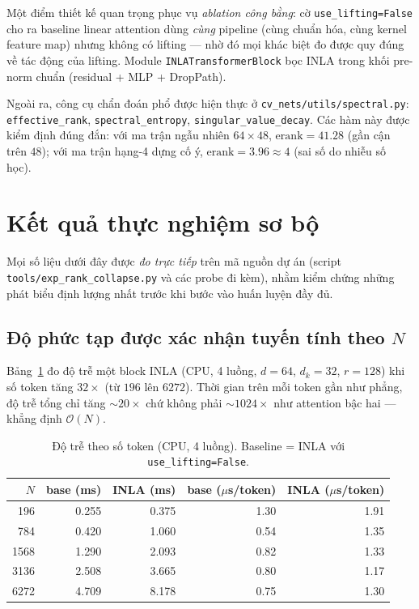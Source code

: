 \documentclass[12pt,a4paper]{article}
\begin{document}
Một điểm thiết kế quan trọng phục vụ \emph{ablation công bằng}: cờ \texttt{use\_lifting=False} cho ra
baseline linear attention dùng \emph{cùng} pipeline (cùng chuẩn hóa, cùng kernel feature map) nhưng
không có lifting --- nhờ đó mọi khác biệt đo được quy đúng về tác động của lifting. Module
\texttt{INLATransformerBlock} bọc INLA trong khối pre-norm chuẩn (residual + MLP + DropPath).

Ngoài ra, công cụ chẩn đoán phổ được hiện thực ở \texttt{cv\_nets/utils/spectral.py}:
\texttt{effective\_rank}, \texttt{spectral\_entropy}, \texttt{singular\_value\_decay}. Các hàm này
được kiểm định đúng đắn: với ma trận ngẫu nhiên $64\times 48$, $\mathrm{erank}=41.28$ (gần cận trên
$48$); với ma trận hạng-4 dựng cố ý, $\mathrm{erank}=3.96 \approx 4$ (sai số do nhiễu số học).

\section{Kết quả thực nghiệm sơ bộ}
\label{sec:exp}

Mọi số liệu dưới đây được \emph{đo trực tiếp} trên mã nguồn dự án (script
\texttt{tools/exp\_rank\_collapse.py} và các probe đi kèm), nhằm kiểm chứng những phát biểu định
lượng nhất trước khi bước vào huấn luyện đầy đủ.

\subsection{Độ phức tạp được xác nhận tuyến tính theo $N$}
Bảng~\ref{tab:complexity} đo độ trễ một block INLA (CPU, 4 luồng, $d=64$, $d_k=32$, $r=128$) khi số
token tăng $32\times$ (từ $196$ lên $6272$). Thời gian trên mỗi token gần như phẳng, độ trễ tổng chỉ
tăng $\sim 20\times$ chứ không phải $\sim 1024\times$ như attention bậc hai --- khẳng định
$\mathcal{O}(N)$.

\begin{table}[H]
\centering
\caption{Độ trễ theo số token (CPU, 4 luồng). Baseline = INLA với \texttt{use\_lifting=False}.}
\label{tab:complexity}
\begin{tabular}{@{}rrrrr@{}}
\toprule
$N$ & base (ms) & INLA (ms) & base ($\mu$s/token) & INLA ($\mu$s/token) \\
\midrule
196  & 0.255 & 0.375 & 1.30 & 1.91 \\
784  & 0.420 & 1.060 & 0.54 & 1.35 \\
1568 & 1.290 & 2.093 & 0.82 & 1.33 \\
3136 & 2.508 & 3.665 & 0.80 & 1.17 \\
6272 & 4.709 & 8.178 & 0.75 & 1.30 \\
\bottomrule
\end{tabular}
\end{table}
\end{document}
